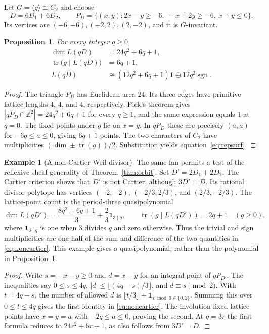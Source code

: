 \documentclass[12pt,letterpaper]{article}
\newtheorem{proposition}[theorem]{Proposition}
\theoremstyle{definition}
\newtheorem{example}[theorem]{Example}
\theoremstyle{remark}
\numberwithin{equation}{section}
\DeclareMathOperator{\tr}{tr}
\newcommand{\ZZ}{\mathbb Z}
\newcommand{\bfone}{\mathbf 1}
\begin{document}
Let $G=\langle g\rangle\cong C_2$ and choose
\begin{equation}\label{eq:Dsurface}
D=6D_1+6D_2,
\qquad
P_D=\{(x,y):2x-y\geq-6,\ -x+2y\geq-6,\ x+y\leq0\}.
\end{equation}
Its vertices are $(-6,-6),(-2,2),(2,-2)$, and it is $G$-invariant.

\begin{proposition}\label{prop:cyclic}
For every integer $q\geq0$,
\begin{align}
\dim L(qD)&=24q^2+6q+1,\label{eq:ehrhartsurf}\\
\tr\bigl(g\mid L(qD)\bigr)&=6q+1,\label{eq:fixedsurf}\\
L(qD)&\cong(12q^2+6q+1)\bfone\oplus
12q^2\operatorname{sgn}.\label{eq:repsurf}
\end{align}
\end{proposition}
\begin{proof}
The triangle $P_D$ has Euclidean area $24$. Its three edges have primitive lattice lengths $4$, $4$, and $4$, respectively. Pick's theorem gives $|qP_D\cap\ZZ^2|=24q^2+6q+1$ for every $q\geq1$, and the same expression equals $1$ at $q=0$. The fixed points under $g$ lie on $x=y$. In $qP_D$ these are precisely $(a,a)$ for $-6q\leq a\leq0$, giving $6q+1$ points. The two characters of $C_2$ have multiplicities $(\dim\pm\tr(g))/2$. Substitution yields equation~\eqref{eq:repsurf}.
\end{proof}


\begin{example}[A non-Cartier Weil divisor]\label{ex:noncartier}
The same fan permits a test of the reflexive-sheaf generality of Theorem~\ref{thm:orbit}. Set $D'=2D_1+2D_2$. The Cartier criterion shows that $D'$ is not Cartier, although $3D'=D$. Its rational divisor polytope has vertices $(-2,-2)$, $(-2/3,2/3)$, and $(2/3,-2/3)$. The lattice-point count is the period-three quasipolynomial
\begin{equation}\label{eq:noncartier}
\dim L(qD')=\frac{8q^2+6q+1}{3}+\frac23\mathbf1_{3\mid q},\qquad
\tr(g\mid L(qD'))=2q+1\quad(q\geq0),
\end{equation}
where $\mathbf1_{3\mid q}$ is one when $3$ divides $q$ and zero otherwise. Thus the trivial and sign multiplicities are one half of the sum and difference of the two quantities in \eqref{eq:noncartier}. This example gives a quasipolynomial, rather than the polynomial in Proposition~\ref{prop:cyclic}.
\end{example}
\begin{proof}
Write $s=-x-y\geq0$ and $d=x-y$ for an integral point of $qP_{D'}$. The inequalities say $0\leq s\leq4q$, $|d|\leq\lfloor(4q-s)/3\rfloor$, and $d\equiv s\pmod2$. With $t=4q-s$, the number of allowed $d$ is
$\lfloor t/3\rfloor+\mathbf1_{\,t\bmod3\in\{0,2\}}$.
Summing this over $0\leq t\leq4q$ gives the first identity in \eqref{eq:noncartier}. The involution-fixed lattice points have $x=y=a$ with $-2q\leq a\leq0$, proving the second. At $q=3r$ the first formula reduces to $24r^2+6r+1$, as also follows from $3D'=D$.
\end{proof}
\end{document}
